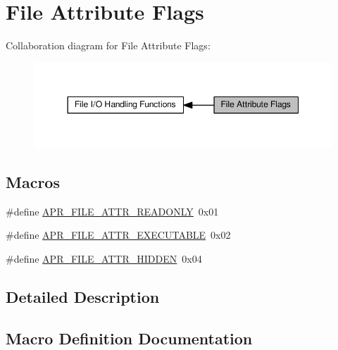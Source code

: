 \hypertarget{group__apr__file__attrs__set__flags}{}\section{File Attribute Flags}
\label{group__apr__file__attrs__set__flags}
Collaboration diagram for File Attribute Flags\+:
\nopagebreak
\begin{figure}[H]
\begin{center}
\leavevmode
\includegraphics[width=350pt]{group__apr__file__attrs__set__flags}
\end{center}
\end{figure}
\subsection*{Macros}
\begin{DoxyCompactItemize}
\item 
\#define \hyperlink{group__apr__file__attrs__set__flags_ga333f2c798495cfb95ee624e11c862e38}{A\+P\+R\+\_\+\+F\+I\+L\+E\+\_\+\+A\+T\+T\+R\+\_\+\+R\+E\+A\+D\+O\+N\+LY}~0x01
\item 
\#define \hyperlink{group__apr__file__attrs__set__flags_ga51346f433e354f0bc8722388b6b275fd}{A\+P\+R\+\_\+\+F\+I\+L\+E\+\_\+\+A\+T\+T\+R\+\_\+\+E\+X\+E\+C\+U\+T\+A\+B\+LE}~0x02
\item 
\#define \hyperlink{group__apr__file__attrs__set__flags_ga68c188c0e56b9abdef3c97ffd913c5aa}{A\+P\+R\+\_\+\+F\+I\+L\+E\+\_\+\+A\+T\+T\+R\+\_\+\+H\+I\+D\+D\+EN}~0x04
\end{DoxyCompactItemize}


\subsection{Detailed Description}


\subsection{Macro Definition Documentation}
